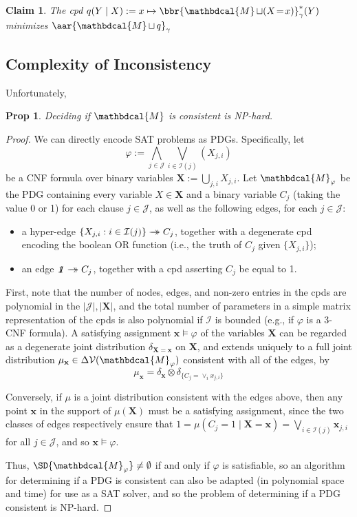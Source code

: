 \documentclass{article}
\theoremstyle{plain}
\newtheorem{prop}[theorem]{Prop}
\newtheorem{claim}[theorem]{Claim}%
\newcounter{proofcntr}
\newenvironment{lproof}{\begin{proof}\refstepcounter{proofcntr}}{\end{proof}}
\theoremstyle{definition}
\theoremstyle{remark}
\newcommand\mat[1]{\mathbf{#1}}
\newcommand{\tto}{\rightarrow\mathrel{\mspace{-15mu}}\rightarrow}
\newcommand{\V}{\mathcal V}
\newcommand{\dg}[1]{\mathbdcal{#1}}
\DeclareMathOperator{\bundle}{\sqcup}
\newcommand{\pdgunit}{\mathrlap{\mathit 1} \mspace{2.3mu}\mathit 1}
\begin{document}
\begin{claim}
 	The cpd $q(Y \mid X) := x \mapsto \bbr{\dg M \bundle (X\!=\!x)}^*_\gamma(Y)$
	minimizes $\aar{\dg M \bundle q}_\gamma$
\end{claim} 

\subsection{Complexity of Inconsistency}
Unfortunately, 

\begin{prop}\label{prop:consistent-NP-hard}
	Deciding if $\dg M$ is consistent is NP-hard.
\end{prop}
\begin{lproof} \label{proof:consistent-NP-hard}
	We can directly encode SAT problems as PDGs.
	Specifically, let 
	$$\varphi := \bigwedge_{j \in \mathcal J} \bigvee_{i \in \mathcal I(j)} (X_{j,i})$$
	be a CNF formula over binary variables $\mat X := \bigcup_{j,i} X_{j,i}$. Let
	$\dg M_\varphi$ be the PDG containing every variable $X \in \mat X$ and a binary
	variable $C_j$ (taking the value 0 or 1) for each clause $j \in \mathcal J$, as well as the following edges, for each $j \in \mathcal J$:
	\begin{itemize}	
		\item a hyper-edge $\{X_{j,i} : i \in \mathcal I(j)\} \tto C_j$, together with a degenerate cpd
			encoding the boolean OR function (i.e., the truth of $C_j$ given $\{X_{j,i}\}$);
		\item an edge $\pdgunit \tto C_j$, together with a cpd asserting $C_j$ be equal to 1.
	\end{itemize}
	First, note that the number of nodes, edges, and non-zero entries in the cpds are polynomial in the $|\mathcal J|, |\mat X|$, and the total number of parameters in a simple matrix representation of the cpds is also polynomial if $\mathcal I$ is bounded (e.g., if $\varphi$ is a 3-CNF formula). 
	A satisfying assignment $\mat x \models \varphi$ of the variables $\mat X$ can be regarded as a degenerate joint distribution $\delta_{\mat X = \mat x}$ on $\mat X$, and extends uniquely to a full joint distribution $\mu_{\mat x} \in \Delta \V(\dg M_\varphi)$ consistent with all of the edges, by
	\[ \mu_{\mat x} = \delta_{\mat x} \otimes \delta_{\{C_j = \vee_i  x_{j,i}\}} \]
	
 	Conversely, if $\mu$ is a joint distribution consistent with the edges above, then any point $\mat x$ in the support of $\mu(\mat X)$ must be a satisfying assignment, since the two classes of edges respectively ensure that $1 =\mu(C_j\!=\! 1 \mid \mat X \!=\! \mat x) = \bigvee_{i \in \mathcal I(j)} \mat x_{j,i}$ for all $j \in \mathcal J$, and so $\mat x \models \varphi$.
	
	Thus, $\SD{\dg M_\varphi} \ne \emptyset$ if and only if $\varphi$ is satisfiable, so 
	an algorithm for determining if a PDG is consistent can also be adapted (in polynomial space and time) for use as a SAT solver, and so the problem of determining if a PDG consistent is NP-hard.
\end{lproof}
\end{document}
